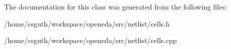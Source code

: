 The documentation for this class was generated from the following files\-:\begin{DoxyCompactItemize}
\item 
/home/csguth/workspace/openeda/src/netlist/cells.\-h\item 
/home/csguth/workspace/openeda/src/netlist/cells.\-cpp\end{DoxyCompactItemize}
